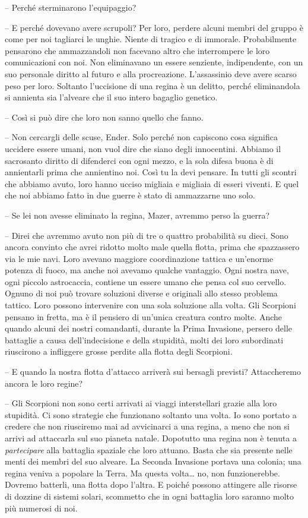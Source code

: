 {-- Perché sterminarono l'equipaggio?}

{-- E perché dovevano avere scrupoli? Per loro, perdere alcuni membri
	del gruppo è come per noi tagliarci le unghie. Niente di tragico e di
	immorale. Probabilmente pensarono che ammazzandoli non facevano altro
	che interrompere le loro comunicazioni con noi. Non eliminavano un
	essere senziente, indipendente, con un suo personale diritto al futuro e
	alla procreazione. L'assassinio deve avere scarso peso per loro.
	Soltanto l'uccisione di una regina è un delitto, perché eliminandola si
	annienta sia l'alveare che il suo intero bagaglio genetico.}

{-- Così si può dire che loro non sanno quello che fanno.}

{-- Non cercargli delle scuse, Ender. Solo perché non capiscono cosa
	significa uccidere essere umani, non vuol dire che siano degli
	innocentini. Abbiamo il sacrosanto diritto di difenderci con ogni mezzo,
	e la sola difesa buona è di annientarli prima che annientino noi. Così
	tu la devi pensare. In tutti gli scontri che abbiamo avuto, loro hanno
	ucciso migliaia e migliaia di esseri viventi. E quel che noi abbiamo
	fatto in due guerre è stato di ammazzarne uno solo.}

{-- Se lei non avesse eliminato la regina, Mazer, avremmo perso la
	guerra?}

{-- Direi che avremmo avuto non più di tre o quattro probabilità su
	dieci. Sono ancora convinto che avrei ridotto molto male quella flotta,
	prima che spazzassero via le mie navi. Loro avevano maggiore
	coordinazione tattica e un'enorme potenza di fuoco, ma anche noi avevamo
	qualche vantaggio. Ogni nostra nave, ogni piccolo astrocaccia, contiene
	un essere umano che pensa col suo cervello. Ognuno di noi può trovare
	soluzioni diverse e originali allo stesso problema tattico. Loro possono
	intervenire con una sola soluzione alla volta. Gli Scorpioni pensano in
	fretta, ma è il pensiero di un'unica creatura contro molte. Anche quando
	alcuni dei nostri comandanti, durante la Prima Invasione, persero delle
	battaglie a causa dell'indecisione e della stupidità, molti dei loro
	subordinati riuscirono a infliggere grosse perdite alla flotta degli
	Scorpioni.}

{-- E quando la nostra flotta d'attacco arriverà sui bersagli previsti?
	Attaccheremo ancora le loro regine?}

{-- Gli Scorpioni non sono certi arrivati ai viaggi interstellari grazie
	alla loro stupidità. Ci sono strategie che funzionano soltanto una
	volta. Io sono portato a credere che non riusciremo mai ad avvicinarci a
	una regina, a meno che non si arrivi ad attaccarla sul suo pianeta
	natale. Dopotutto una regina non è tenuta a \emph{partecipare} alla
	battaglia spaziale che loro attuano. Basta che sia presente nelle menti
	dei membri del suo alveare. La Seconda Invasione portava una colonia;
	una regina veniva a popolare la Terra. Ma questa volta\ldots{} no, non
	funzionerebbe. Dovremo batterli, una flotta dopo l'altra. E poiché
	possono attingere alle risorse di dozzine di sistemi solari, scommetto
	che in ogni battaglia loro saranno molto più numerosi di noi.}

